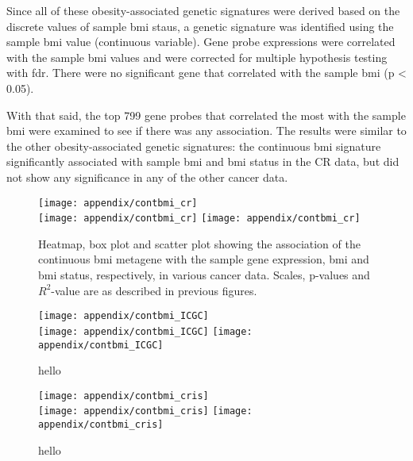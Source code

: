 \begin{appendices}
	Since all of these obesity-associated genetic signatures were derived based on the discrete values of sample \gls{bmi} staus, a genetic signature was identified using the sample \gls{bmi} value (continuous variable).
	Gene probe expressions were correlated with the sample \gls{bmi} values and were corrected for multiple hypothesis testing with \gls{fdr}.
	There were no significant gene that correlated with the sample \gls{bmi} (p \textless{} 0.05).

	With that said, the top 799 gene probes that correlated the most with the sample \gls{bmi} were examined to see if there was any association.
	The results were similar to the other obesity-associated genetic signatures: the continuous \gls{bmi} signature significantly associated with sample \gls{bmi} and \gls{bmi} status in the CR data, but did not show any significance in any of the other cancer data.

	\begin{figure}[htp!]
		\centering
		\texttt{[image: appendix/contbmi\_cr]}\\
		\texttt{[image: appendix/contbmi\_cr]}
		\hfill
		\texttt{[image: appendix/contbmi\_cr]}
		\caption[Continuous \gls{bmi} metagene in various cancer data]{Heatmap, box plot and scatter plot showing the association of the continuous \gls{bmi} metagene with the sample gene expression, \gls{bmi} and \gls{bmi} status, respectively, in various cancer data.
		Scales, p-values and $R^2$-value are as described in previous figures.}
		\label{fig:cont_bmi}
	\end{figure}

	\begin{figure}[htp!]
		\ContinuedFloat
		\captionsetup{list=off,format=cont}
		\centering
		\texttt{[image: appendix/contbmi\_ICGC]}\\
		\texttt{[image: appendix/contbmi\_ICGC]}
		\hfill
		\texttt{[image: appendix/contbmi\_ICGC]}
		\caption{hello}
	\end{figure}

	\begin{figure}[htp!]
		\ContinuedFloat
		\captionsetup{list=off,format=cont}
		\centering
		\texttt{[image: appendix/contbmi\_cris]}\\
		\texttt{[image: appendix/contbmi\_cris]}
		\hfill
		\texttt{[image: appendix/contbmi\_cris]}
		\caption{hello}
	\end{figure}


\end{appendices}
